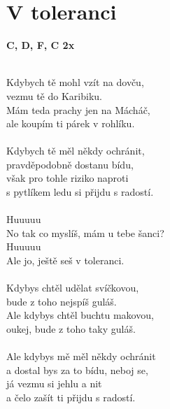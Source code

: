 \section{V toleranci}
\footnotesize\textbf{C, D\7, F, C 2x}\\
\\
\normalsize
\begin{multicols}{2}
\color{blue}
\textcolor{black}{}Kdybych tě mohl vzít \textcolor{black}{}na dovču,\\
\textcolor{black}{}vezmu tě do Kari\textcolor{black}{}biku.\\
Mám teda prachy jen na Mácháč,\\
ale koupím ti párek v rohlíku.\\
\\
\textcolor{black}{}Kdybych tě měl někdy \textcolor{black}{}ochránit,\\
\textcolor{black}{}pravděpodobně \textcolor{black}{}dostanu \textcolor{black}{}bídu,\\
\textcolor{black}{}však pro tohle riziko \textcolor{black}{}naproti\\
\textcolor{black}{}s pytlíkem ledu si \textcolor{black}{}přijdu \textcolor{black}{}s radostí.\\
\\
\color{black}
Huuuuu\\
\color{blue}
No tak co \textcolor{black}{}myslíš, mám \textcolor{black}{}u tebe \textcolor{black}{}šanci?\\
\color{black}
Huuuuu\\
\color{red}
\textcolor{black}{}Ale jo, \textcolor{black}{}ještě seš \textcolor{black}{}v tole\textcolor{black}{}ranci.\\
\\
Kdybys chtěl udělat svíčkovou,\\
bude z toho nejspíš guláš.\\
Ale kdybys chtěl buchtu makovou,\\
oukej, bude z toho taky guláš.\\
\\
Ale kdybys mě měl někdy ochránit\\
a dostal bys za to bídu, neboj se,\\
já vezmu si jehlu a nit\\
a čelo zašít ti přijdu s radostí.\\

\end{multicols}
